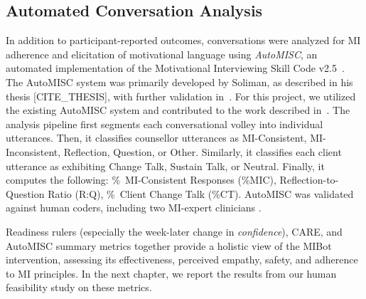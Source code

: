 \subsection{Automated Conversation Analysis}
\label{subsec:automisc}
In addition to participant-reported outcomes, conversations were analyzed for MI adherence and elicitation of motivational language using \textit{AutoMISC}, an automated implementation of the Motivational Interviewing Skill Code v2.5~\citep{Houck2010}. The AutoMISC system was primarily developed by Soliman, as described in his thesis [CITE\_THESIS], with further validation in~\cite{ali2025automated}. For this project, we utilized the existing AutoMISC system and contributed to the work described in~\cite{mahmood-etal-2025-fully}. The analysis pipeline first segments each conversational volley into individual utterances. Then, it classifies counsellor utterances as MI-Consistent, MI-Inconsistent, Reflection, Question, or Other. Similarly, it classifies each client utterance as exhibiting Change Talk, Sustain Talk, or Neutral. Finally, it computes the following: \%~MI-Consistent Responses (\%MIC), Reflection-to-Question Ratio (R:Q), \%~Client Change Talk (\%CT). AutoMISC was validated against human coders, including two MI-expert clinicians \cite{mahmood-etal-2025-fully}.


Readiness rulers (especially the week-later change in \emph{confidence}), CARE, and AutoMISC summary metrics together provide a holistic view of the MIBot intervention, assessing its effectiveness, perceived empathy, safety, and adherence to MI principles. In the next chapter, we report the results from our human feasibility study on these metrics.
